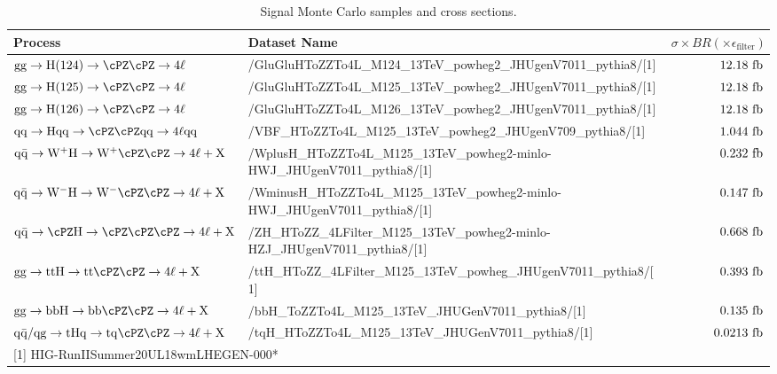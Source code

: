 \begin{table}
\begin{scriptsize}
	\centering
    \begin{tabular}{|l|l|r|}
	\hline
 	Process & Dataset Name & $\sigma\times BR (\times\epsilon_{\text{filter}})$ \\ \hline
	$\rm{gg}\to\rm{H(124)}\to\cPZ\cPZ \to 4\ell$ & /GluGluHToZZTo4L\_M124\_13TeV\_powheg2\_JHUgenV7011\_pythia8/[1] & $12.18~\rm{fb}$ \\ %
	$\rm{gg}\to\rm{H(125)}\to\cPZ\cPZ \to 4\ell$ & /GluGluHToZZTo4L\_M125\_13TeV\_powheg2\_JHUgenV7011\_pythia8/[1] & $12.18~\rm{fb}$ \\ %
	$\rm{gg}\to\rm{H(126)}\to\cPZ\cPZ \to 4\ell$ & /GluGluHToZZTo4L\_M126\_13TeV\_powheg2\_JHUgenV7011\_pythia8/[1] & $12.18~\rm{fb}$ \\ %
 	$\rm{qq}\to\rm{Hqq}\to\cPZ\cPZ\rm{qq}\to4\ell qq$ & /VBF\_HToZZTo4L\_M125\_13TeV\_powheg2\_JHUgenV709\_pythia8/[1] & $1.044~\rm{fb}$ \\ %
 	$\rm{q\bar{q}}\to\rm{W^{+}H}\to\rm{W^{+}}\cPZ\cPZ\to4\ell+\rm{X}$ & /WplusH\_HToZZTo4L\_M125\_13TeV\_powheg2-minlo-HWJ\_JHUgenV7011\_pythia8/[1] & $0.232~\rm{fb}$ \\ %
 	$\rm{q\bar{q}}\to\rm{W^{-}H}\to\rm{W^{-}}\cPZ\cPZ\to4\ell+\rm{X}$ & /WminusH\_HToZZTo4L\_M125\_13TeV\_powheg2-minlo-HWJ\_JHUgenV7011\_pythia8/[1] & $0.147~\rm{fb}$ \\ %
 	$\rm{q\bar{q}}\to\cPZ \rm{H}\to\cPZ\cPZ\cPZ\to4\ell+\rm{X}$ & /ZH\_HToZZ\_4LFilter\_M125\_13TeV\_powheg2-minlo-HZJ\_JHUgenV7011\_pythia8/[1] & $0.668~\rm{fb}$ \\ %
 	$\rm{gg}\to\rm{ttH} \to\rm{tt}\cPZ\cPZ\to4\ell+\rm{X}$ & /ttH\_HToZZ\_4LFilter\_M125\_13TeV\_powheg\_JHUgenV7011\_pythia8/[1] & $0.393~\rm{fb}$ \\ %
	$\rm{gg}\to\rm{bbH} \to\rm{bb}\cPZ\cPZ\to4\ell+\rm{X}$ & /bbH\_ToZZTo4L\_M125\_13TeV\_JHUGenV7011\_pythia8/[1] & $0.135~\rm{fb}$ \\
	$\rm{q\bar{q}}/\rm{qg}\to tHq \to tq\cPZ\cPZ\to4\ell+\rm{X}$ & /tqH\_HToZZTo4L\_M125\_13TeV\_JHUGenV7011\_pythia8/[1] & $0.0213~\rm{fb}$ \\
 	\hline
	\multicolumn{3}{l}{[1] HIG-RunIISummer20UL18wmLHEGEN-000*} \\  %
 	\end{tabular}
 	\caption{Signal Monte Carlo samples and cross sections.}
  	\label{tab:SignalSamples}
\end{scriptsize}
\end{table}

